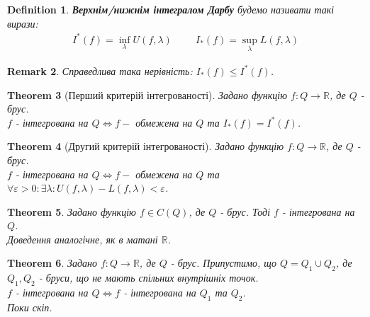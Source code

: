 \documentclass[a4paper, 10pt]{article}
\theoremstyle{theoremdd}
\newtheorem{theorem}{Theorem}[subsection]
\theoremstyle{theoremdd}
\newtheorem{definition}[theorem]{Definition}
\theoremstyle{theoremdd}
\theoremstyle{theoremdd}
\theoremstyle{theoremdd}
\theoremstyle{theoremdd}
\newtheorem{remark}[theorem]{Remark}
\theoremstyle{theoremdd}
\theoremstyle{theoremdd}
\begin{document}
\begin{definition}
\textbf{Верхнім/нижнім інтегралом Дарбу} будемо називати такі вирази:
\begin{align*}
I^*(f) = \inf_\lambda U(f,\lambda) \hspace{1cm} I_*(f) = \sup_{\lambda} L(f,\lambda)
\end{align*}
\end{definition}

\begin{remark}
Справедлива така нерівність: $I_*(f) \leq I^*(f)$.
\end{remark}

\begin{theorem}[Перший критерій інтегрованості]
Задано функцію $f: Q \to \mathbb{R}$, де $Q$ - брус.\\
$f$ - інтегрована на $Q \iff f -$ обмежена на $Q$ та $I_*(f) = I^*(f)$.
\end{theorem}

\begin{theorem}[Другий критерій інтегрованості]
Задано функцію $f: Q \to \mathbb{R}$, де $Q$ - брус.\\
$f$ - інтегрована на $Q \iff f -$ обмежена на $Q$ та $\forall \varepsilon > 0: \exists \lambda: U(f,\lambda) - L(f,\lambda) < \varepsilon$.
\end{theorem}

\begin{theorem}
Задано функцію $f \in C(Q)$, де $Q$ - брус. Тоді $f$ - інтегрована на $Q$.\\
\textit{Доведення аналогічне, як в матані $\mathbb{R}$.}
\end{theorem}

\begin{theorem}
Задано $f: Q \to \mathbb{R}$, де $Q$ - брус. Припустимо, що $Q = Q_1 \cup Q_2$, де $Q_1,Q_2$ - бруси, що не мають спільних внутрішніх точок.\\
$f$ - інтегрована на $Q \iff f$ - інтегрована на $Q_1$ та $Q_2$.\\
\textit{Поки скіп.}
\end{theorem}
\end{document}
